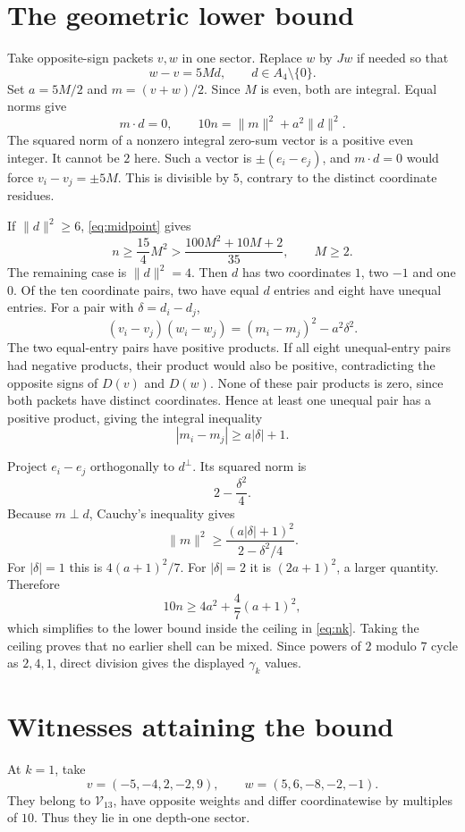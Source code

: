 \section{The geometric lower bound}
Take opposite-sign packets $v,w$ in one sector. Replace $w$ by $Jw$ if needed so that
\[
w-v=5Md,\qquad d\in A_4\setminus\{0\}.
\]
Set $a=5M/2$ and $m=(v+w)/2$. Since $M$ is even, both are integral. Equal norms give
\begin{equation}\label{eq:midpoint}
m\cdot d=0,\qquad10n=\|m\|^2+a^2\|d\|^2.
\end{equation}
The squared norm of a nonzero integral zero-sum vector is a positive even integer. It cannot be $2$ here. Such a vector is $\pm(e_i-e_j)$, and $m\cdot d=0$ would force $v_i-v_j=\pm5M$. This is divisible by $5$, contrary to the distinct coordinate residues.

If $\|d\|^2\ge6$, \eqref{eq:midpoint} gives
\[
n\ge\frac{15}{4}M^2>\frac{100M^2+10M+2}{35},\qquad M\ge2.
\]
The remaining case is $\|d\|^2=4$. Then $d$ has two coordinates $1$, two $-1$ and one $0$. Of the ten coordinate pairs, two have equal $d$ entries and eight have unequal entries. For a pair with $\delta=d_i-d_j$,
\[
(v_i-v_j)(w_i-w_j)=(m_i-m_j)^2-a^2\delta^2.
\]
The two equal-entry pairs have positive products. If all eight unequal-entry pairs had negative products, their product would also be positive, contradicting the opposite signs of $D(v)$ and $D(w)$. None of these pair products is zero, since both packets have distinct coordinates. Hence at least one unequal pair has a positive product, giving the integral inequality
\[
|m_i-m_j|\ge a|\delta|+1.
\]

Project $e_i-e_j$ orthogonally to $d^\perp$. Its squared norm is
\[
2-\frac{\delta^2}{4}.
\]
Because $m\perp d$, Cauchy's inequality gives
\[
\|m\|^2\ge\frac{(a|\delta|+1)^2}{2-\delta^2/4}.
\]
For $|\delta|=1$ this is $4(a+1)^2/7$. For $|\delta|=2$ it is $(2a+1)^2$, a larger quantity. Therefore
\[
10n\ge4a^2+\frac47(a+1)^2,
\]
which simplifies to the lower bound inside the ceiling in \eqref{eq:nk}. Taking the ceiling proves that no earlier shell can be mixed. Since powers of $2$ modulo $7$ cycle as $2,4,1$, direct division gives the displayed $\gamma_k$ values.

\section{Witnesses attaining the bound}
At $k=1$, take
\[
v=(-5,-4,2,-2,9),\qquad w=(5,6,-8,-2,-1).
\]
They belong to $\mathcal V_{13}$, have opposite weights and differ coordinatewise by multiples of $10$. Thus they lie in one depth-one sector.

